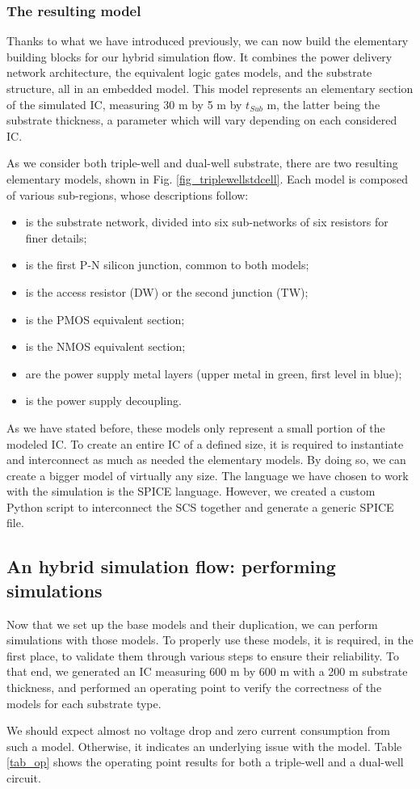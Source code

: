 	\subsubsection{The resulting model}
		Thanks to what we have introduced previously, we can now build the elementary building blocks for our hybrid simulation flow.
		It combines the power delivery network architecture, the equivalent logic gates models, and the substrate structure, all in an embedded model.
		This model represents an elementary section of the simulated IC, measuring 30 \textmu m by 5 \textmu m by $t_{Sub}$ \textmu m, the latter being the substrate thickness, a parameter which will vary depending on each considered IC.
		
		As we consider both triple-well and dual-well substrate, there are two resulting elementary models, shown in Fig. \ref{fig_triplewellstdcell}.
		Each model is composed of various sub-regions, whose descriptions follow:
		\begin{itemize}
			\item {} is the substrate network, divided into six sub-networks of six resistors for finer details;
			\item {} is the first P-N silicon junction, common to both models;
			\item {} is the access resistor (DW) or the second junction (TW);
			\item {} is the PMOS equivalent section;
			\item {} is the NMOS equivalent section;
			\item {} are the power supply metal layers (upper metal in green, first level in blue);
			\item {} is the power supply decoupling.
		\end{itemize}
		As we have stated before, these models only represent a small portion of the modeled IC.
		To create an entire IC of a defined size, it is required to instantiate and interconnect as much as needed the elementary models.
		By doing so, we can create a bigger model of virtually any size.
		The language we have chosen to work with the simulation is the SPICE language.
		However, we created a custom Python script to interconnect the SCS together and generate a generic SPICE file.

\subsection{An hybrid simulation flow: performing simulations}
	Now that we set up the base models and their duplication, we can perform simulations with those models.
	To properly use these models, it is required, in the first place, to validate them through various steps to ensure their reliability.
	To that end, we generated an IC measuring 600 \textmu m by 600 \textmu m with a 200 \textmu m substrate thickness, and performed an operating point to verify the correctness of the models for each substrate type.
	
	We should expect almost no voltage drop and zero current consumption from such a model.
	Otherwise, it indicates an underlying issue with the model.
	Table \ref{tab_op} shows the operating point results for both a triple-well and a dual-well circuit.